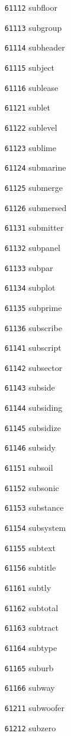 \documentclass[twoside,11pt]{article}
\begin{document}
\begin{multicols}{5}
\begin{enumerate}
\item[\texttt{61112}] subfloor
\item[\texttt{61113}] subgroup
\item[\texttt{61114}] subheader
\item[\texttt{61115}] subject
\item[\texttt{61116}] sublease
\item[\texttt{61121}] sublet
\item[\texttt{61122}] sublevel
\item[\texttt{61123}] sublime
\item[\texttt{61124}] submarine
\item[\texttt{61125}] submerge
\item[\texttt{61126}] submersed
\item[\texttt{61131}] submitter
\item[\texttt{61132}] subpanel
\item[\texttt{61133}] subpar
\item[\texttt{61134}] subplot
\item[\texttt{61135}] subprime
\item[\texttt{61136}] subscribe
\item[\texttt{61141}] subscript
\item[\texttt{61142}] subsector
\item[\texttt{61143}] subside
\item[\texttt{61144}] subsiding
\item[\texttt{61145}] subsidize
\item[\texttt{61146}] subsidy
\item[\texttt{61151}] subsoil
\item[\texttt{61152}] subsonic
\item[\texttt{61153}] substance
\item[\texttt{61154}] subsystem
\item[\texttt{61155}] subtext
\item[\texttt{61156}] subtitle
\item[\texttt{61161}] subtly
\item[\texttt{61162}] subtotal
\item[\texttt{61163}] subtract
\item[\texttt{61164}] subtype
\item[\texttt{61165}] suburb
\item[\texttt{61166}] subway
\item[\texttt{61211}] subwoofer
\item[\texttt{61212}] subzero

\end{enumerate}
\end{multicols}
\end{document}
